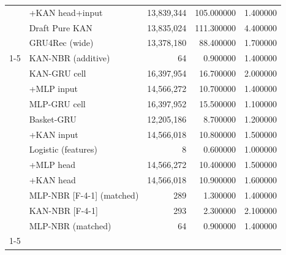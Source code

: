 \begin{table}[H]
\begin{tabular}{llrrr}
 & +KAN head+input & 13,839,344 & 105.000000 & 1.400000 \\
 & Draft Pure KAN & 13,835,024 & 111.300000 & 4.400000 \\
 & GRU4Rec (wide) & 13,378,180 & 88.400000 & 1.700000 \\
\cline{1-5}
\multirow[t]{12}{*}{dunnhumby} & KAN-NBR (additive) & 64 & 0.900000 & 1.400000 \\
 & KAN-GRU cell & 16,397,954 & 16.700000 & 2.000000 \\
 & +MLP input & 14,566,272 & 10.700000 & 1.400000 \\
 & MLP-GRU cell & 16,397,952 & 15.500000 & 1.100000 \\
 & Basket-GRU & 12,205,186 & 8.700000 & 1.200000 \\
 & +KAN input & 14,566,018 & 10.800000 & 1.500000 \\
 & Logistic (features) & 8 & 0.600000 & 1.000000 \\
 & +MLP head & 14,566,272 & 10.400000 & 1.500000 \\
 & +KAN head & 14,566,018 & 10.900000 & 1.600000 \\
 & MLP-NBR [F-4-1] (matched) & 289 & 1.300000 & 1.400000 \\
 & KAN-NBR [F-4-1] & 293 & 2.300000 & 2.100000 \\
 & MLP-NBR (matched) & 64 & 0.900000 & 1.400000 \\
\cline{1-5}
\bottomrule
\end{tabular}
\end{table}
